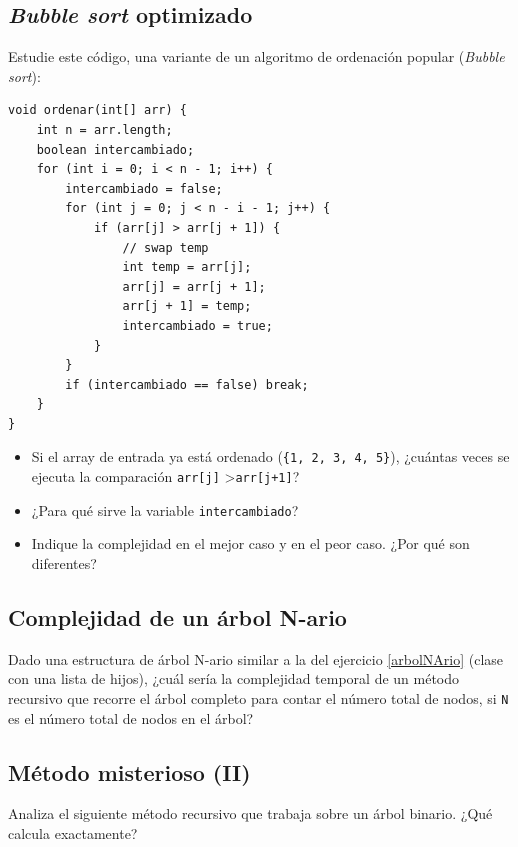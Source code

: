 \documentclass[a4paper]{article}
\newcommand{\code}[1]{\texttt{#1}}
\begin{document}
\subsection{\textit{Bubble sort} optimizado}

Estudie este código, una variante de un algoritmo de ordenación popular (\textit{Bubble sort}):

\begin{verbatim}
void ordenar(int[] arr) {
    int n = arr.length;
    boolean intercambiado;
    for (int i = 0; i < n - 1; i++) {
        intercambiado = false;
        for (int j = 0; j < n - i - 1; j++) {
            if (arr[j] > arr[j + 1]) {
                // swap temp
                int temp = arr[j];
                arr[j] = arr[j + 1];
                arr[j + 1] = temp;
                intercambiado = true;
            }
        }
        if (intercambiado == false) break;
    }
}
\end{verbatim}

\begin{itemize}
    \item Si el array de entrada ya está ordenado (\code{\{1, 2, 3, 4, 5\}}), ¿cuántas veces se ejecuta la comparación \code{arr[j]} >\space \code{arr[j+1]}?
    \item ¿Para qué sirve la variable \code{intercambiado}?
    \item Indique la complejidad en el mejor caso y en el peor caso. ¿Por qué son diferentes?
\end{itemize}

\subsection{Complejidad de un árbol N-ario}

Dado una estructura de árbol N-ario similar a la del ejercicio \ref{arbolNArio} (clase con una lista de hijos), ¿cuál sería la complejidad temporal de un método recursivo que recorre el árbol completo para contar el número total de nodos, si \code{N} es el número total de nodos en el árbol?

\subsection{Método misterioso (II)}

Analiza el siguiente método recursivo que trabaja sobre un árbol binario. ¿Qué calcula exactamente?
\end{document}
